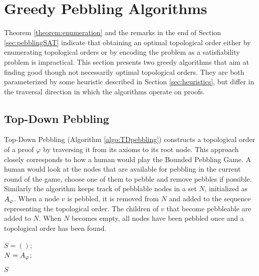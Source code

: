 \section{Greedy Pebbling Algorithms}
\label{sec:algorithms}

Theorem \ref{theorem:enumeration} and the remarks in the end of Section \ref{sec:pebblingSAT} indicate that obtaining an optimal topological order either by enumerating topological orders or by encoding the problem as a satisfiability problem is impractical. 
This section presents two greedy algorithms that aim at finding good though not necessarily optimal topological orders. 
They are both parameterized by some heuristic described in Section \ref{sec:heuristics}, but differ in the traversal direction in which the algorithms operate on proofs.

\subsection{Top-Down Pebbling}

Top-Down Pebbling (Algorithm \ref{algo:TDpebbling}) constructs a topological order of a proof $\varphi$ by traversing it from its axioms to its root node.
This approach closely corresponds to how a human would play the Bounded Pebbling Game. 
A human would look at the nodes that are available for pebbling in the current round of the game, choose one of them to pebble and remove pebbles if possible.
Similarly the algorithm keeps track of pebblable nodes in a set $N$, initialized as $A_{\varphi}$.
When a node $v$ is pebbled, it is removed from $N$ and added to the sequence representing the topological order. The children of $v$ that become pebbleable are added to $N$.
When $N$ becomes empty, all nodes have been pebbled once and a topological order has been found.


\begin{algorithm}[h]
	
	
	$S = ()$;  \\
	
	$N = A_{\varphi}$;  \\
	
	
	\Return $S$\;
	
  \caption[.]{}
  \label{algo:TDpebbling}
\end{algorithm}

